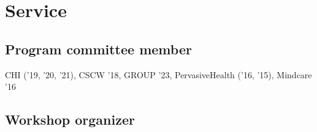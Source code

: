 \documentclass[11pt, a4paper]{article} %
\newcommand{\years}[1]{\marginnote{\scriptsize #1}} %
\begin{document}


\section*{Service}

\subsection*{Program committee member}

CHI ('19, '20, '21), CSCW '18, GROUP '23, PervasiveHealth ('16, '15), Mindcare '16


\subsection*{Workshop organizer}
\end{document}
